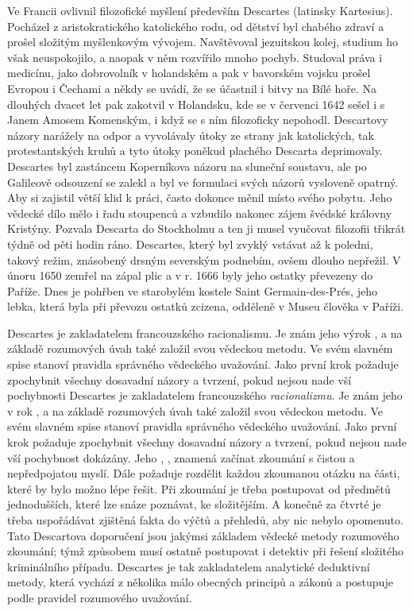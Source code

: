       Ve Francii ovlivnil filozofické myšlení především Descartes (latinsky Kartesius). Pocházel z
      aristokratického katolického rodu, od dětství byl chabého zdraví a prošel složitým myšlenkovým
      vývojem. Navštěvoval jezuitskou kolej, studium ho však neuspokojilo, a naopak v něm rozvířilo
      mnoho pochyb. Studoval práva i medicínu, jako dobrovolník v holandském a pak v bavorském
      vojsku prošel Evropou i Čechami a někdy se uvádí, že se účastnil i bitvy na Bílé hoře.  Na
      dlouhých dvacet let pak zakotvil v Holandsku, kde se v červenci 1642 sešel i s Janem Amosem
      Komenským, i když se s ním filozoficky nepohodl. Descartovy názory narážely na odpor a
      vyvolávaly útoky ze strany jak katolických, tak protestantských kruhů a tyto útoky poněkud
      plachého Descarta deprimovaly. Descartes byl zastáncem Koperníkova názoru na sluneční
      soustavu, ale po Galileově odsouzení se zalekl a byl ve formulaci svých názorů vysloveně
      opatrný. Aby si zajistil větší klid k práci, často dokonce měnil místo svého pobytu. Jeho
      vědecké dílo mělo i řadu stoupenců a vzbudilo nakonec zájem švédské královny Kristýny. Pozvala
      Descarta do Stockholmu a ten ji musel vyučovat filozofii třikrát týdně od pěti hodin ráno.
      Descartes, který byl zvyklý vstávat až k poledni, takový režim, znásobený drsným severským
      podnebím, ovšem dlouho nepřežil. V únoru 1650 zemřel na zápal plic a v r. 1666 byly jeho
      ostatky převezeny do Paříže. Dnes je pohřben ve starobylém kostele Saint Germain-des-Prés,
      jeho lebka, která byla při převozu ostatků zcizena, odděleně v Museu člověka v Paříži. 
      
      Descartes je zakladatelem francouzského racionalismu. Je znám jeho výrok ,
       a na základě rozumových úvah také založil svou vědeckou metodu. Ve svém
      slavném spise  stanoví pravidla správného vědeckého uvažování. Jako
      první krok požaduje zpochybnit všechny dosavadní názory a tvrzení, pokud nejsou nade vší
      pochybnosti Descartes je zakladatelem francouzského \emph{racionalizmu}. Je znám jeho v rok
      ,  a na základě rozumových úvah také založil svou
      vědeckou metodu. Ve svém slavném spise  stanoví pravidla správného
      vědeckého uvažování. Jako první krok požaduje zpochybnit všechny dosavadní názory a tvrzení,
      pokud nejsou nade vší pochybnost dokázány. Jeho , , znamená začínat zkoumání s čistou a nepředpojatou myslí. Dále požaduje rozdělit
      každou zkoumanou otázku na části, které by bylo možno lépe řešit. Při zkoumání je třeba
      postupovat od předmětů jednodušších, které lze snáze poznávat, ke složitějším. A konečně za
      čtvrté je třeba uspořádávat zjištěná fakta do výčtů a přehledů, aby nic nebylo opomenuto. Tato
      Descartova doporučení jsou jakýmsi základem vědecké metody rozumového zkoumání; týmž způsobem
      musí ostatně postupovat i detektiv při řešení složitého kriminálního případu. Descartes je tak
      zakladatelem analytické deduktivní metody, která vychází z několika málo obecných principů a
      zákonů a postupuje podle pravidel rozumového uvažování.


